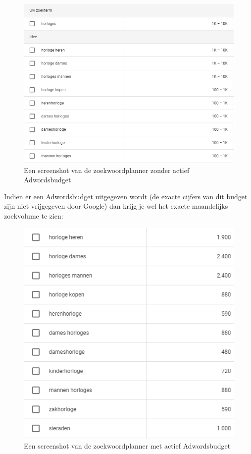 \begin{figure}[h!]
\centering
\includegraphics[width=\linewidth]{img/Zoekwoordplannergratis.PNG}
\caption{Een screenshot van de zoekwoordplanner zonder actief Adwordsbudget \autocite{google.be}}
\end{figure}

Indien er een Adwordsbudget uitgegeven wordt (de exacte cijfers van dit budget zijn niet vrijgegeven door Google) dan krijg je wel het exacte maandelijks zoekvolume te zien: 

\begin{figure}[h!]
\centering
\includegraphics[width=\linewidth]{img/Zoekwoordplannerbet.PNG}
\caption{Een screenshot van de zoekwoordplanner met actief Adwordsbudget \autocite{google.be}}
\end{figure}

